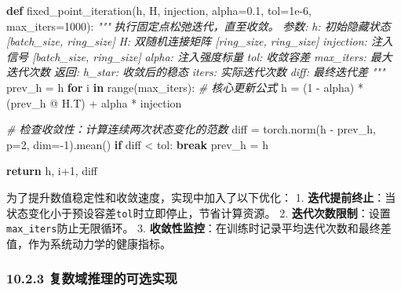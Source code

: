 \documentclass[
  12pt,
]{article}
\newenvironment{Shaded}{}{}
\newcommand{\BuiltInTok}[1]{#1}
\newcommand{\CommentTok}[1]{\textcolor[rgb]{0.38,0.63,0.69}{\textit{#1}}}
\newcommand{\ControlFlowTok}[1]{\textcolor[rgb]{0.00,0.44,0.13}{\textbf{#1}}}
\newcommand{\DecValTok}[1]{\textcolor[rgb]{0.25,0.63,0.44}{#1}}
\newcommand{\FloatTok}[1]{\textcolor[rgb]{0.25,0.63,0.44}{#1}}
\newcommand{\KeywordTok}[1]{\textcolor[rgb]{0.00,0.44,0.13}{\textbf{#1}}}
\newcommand{\NormalTok}[1]{#1}
\newcommand{\OperatorTok}[1]{\textcolor[rgb]{0.40,0.40,0.40}{#1}}
\begin{document}
\begin{Shaded}
\begin{Highlighting}[]
\KeywordTok{def}\NormalTok{ fixed\_point\_iteration(h, H, injection, alpha}\OperatorTok{=}\FloatTok{0.1}\NormalTok{, tol}\OperatorTok{=}\FloatTok{1e{-}6}\NormalTok{, max\_iters}\OperatorTok{=}\DecValTok{1000}\NormalTok{):}
    \CommentTok{"""}
\CommentTok{    执行固定点松弛迭代，直至收敛。}
\CommentTok{    }
\CommentTok{    参数:}
\CommentTok{        h: 初始隐藏状态 [batch\_size, ring\_size]}
\CommentTok{        H: 双随机连接矩阵 [ring\_size, ring\_size]}
\CommentTok{        injection: 注入信号 [batch\_size, ring\_size]}
\CommentTok{        alpha: 注入强度标量}
\CommentTok{        tol: 收敛容差}
\CommentTok{        max\_iters: 最大迭代次数}
\CommentTok{    }
\CommentTok{    返回:}
\CommentTok{        h\_star: 收敛后的稳态}
\CommentTok{        iters: 实际迭代次数}
\CommentTok{        diff: 最终迭代差}
\CommentTok{    """}
\NormalTok{    prev\_h }\OperatorTok{=}\NormalTok{ h}
    \ControlFlowTok{for}\NormalTok{ i }\KeywordTok{in} \BuiltInTok{range}\NormalTok{(max\_iters):}
        \CommentTok{\# 核心更新公式}
\NormalTok{        h }\OperatorTok{=}\NormalTok{ (}\DecValTok{1} \OperatorTok{{-}}\NormalTok{ alpha) }\OperatorTok{*}\NormalTok{ (prev\_h }\OperatorTok{@}\NormalTok{ H.T) }\OperatorTok{+}\NormalTok{ alpha }\OperatorTok{*}\NormalTok{ injection}
        
        \CommentTok{\# 检查收敛性：计算连续两次状态变化的范数}
\NormalTok{        diff }\OperatorTok{=}\NormalTok{ torch.norm(h }\OperatorTok{{-}}\NormalTok{ prev\_h, p}\OperatorTok{=}\DecValTok{2}\NormalTok{, dim}\OperatorTok{={-}}\DecValTok{1}\NormalTok{).mean()}
        \ControlFlowTok{if}\NormalTok{ diff }\OperatorTok{\textless{}}\NormalTok{ tol:}
            \ControlFlowTok{break}
\NormalTok{        prev\_h }\OperatorTok{=}\NormalTok{ h}
    
    \ControlFlowTok{return}\NormalTok{ h, i}\OperatorTok{+}\DecValTok{1}\NormalTok{, diff}
\end{Highlighting}
\end{Shaded}

为了提升数值稳定性和收敛速度，实现中加入了以下优化： 1.
\textbf{迭代提前终止}：当状态变化小于预设容差\texttt{tol}时立即停止，节省计算资源。
2. \textbf{迭代次数限制}：设置\texttt{max\_iters}防止无限循环。 3.
\textbf{收敛性监控}：在训练时记录平均迭代次数和最终差值，作为系统动力学的健康指标。

\hypertarget{ux590dux6570ux57dfux63a8ux7406ux7684ux53efux9009ux5b9eux73b0}{%
\subsubsection{10.2.3
复数域推理的可选实现}\label{ux590dux6570ux57dfux63a8ux7406ux7684ux53efux9009ux5b9eux73b0}}
\end{document}
